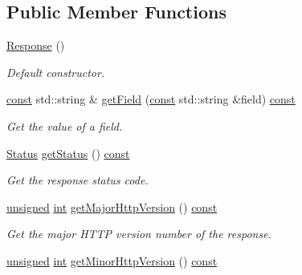 \subsection*{Public Member Functions}
\begin{DoxyCompactItemize}
\item 
\hyperlink{classsf_1_1_http_1_1_response_a2e51c89356fe6a007c448a841a9ec08c}{Response} ()
\begin{DoxyCompactList}\small\item\em Default constructor. \end{DoxyCompactList}\item 
\hyperlink{term__entry_8h_a57bd63ce7f9a353488880e3de6692d5a}{const} std\-::string \& \hyperlink{classsf_1_1_http_1_1_response_a25d7cf86538a1045d31e0b601090b8f0}{get\-Field} (\hyperlink{term__entry_8h_a57bd63ce7f9a353488880e3de6692d5a}{const} std\-::string \&field) \hyperlink{term__entry_8h_a57bd63ce7f9a353488880e3de6692d5a}{const} 
\begin{DoxyCompactList}\small\item\em Get the value of a field. \end{DoxyCompactList}\item 
\hyperlink{classsf_1_1_http_1_1_response_a663e071978e30fbbeb20ed045be874d8}{Status} \hyperlink{classsf_1_1_http_1_1_response_a542e9856b1dd260a83940eb982b7f19a}{get\-Status} () \hyperlink{term__entry_8h_a57bd63ce7f9a353488880e3de6692d5a}{const} 
\begin{DoxyCompactList}\small\item\em Get the response status code. \end{DoxyCompactList}\item 
\hyperlink{curses_8priv_8h_aca40206900cfc164654362fa8d4ad1e6}{unsigned} \hyperlink{term__entry_8h_ad65b480f8c8270356b45a9890f6499ae}{int} \hyperlink{classsf_1_1_http_1_1_response_a3da9c689318b945dd12cbe7167161dc6}{get\-Major\-Http\-Version} () \hyperlink{term__entry_8h_a57bd63ce7f9a353488880e3de6692d5a}{const} 
\begin{DoxyCompactList}\small\item\em Get the major H\-T\-T\-P version number of the response. \end{DoxyCompactList}\item 
\hyperlink{curses_8priv_8h_aca40206900cfc164654362fa8d4ad1e6}{unsigned} \hyperlink{term__entry_8h_ad65b480f8c8270356b45a9890f6499ae}{int} \hyperlink{classsf_1_1_http_1_1_response_a1c2217a6a848695875380a70d060b239}{get\-Minor\-Http\-Version} () \hyperlink{term__entry_8h_a57bd63ce7f9a353488880e3de6692d5a}{const} 

\end{DoxyCompactItemize}
